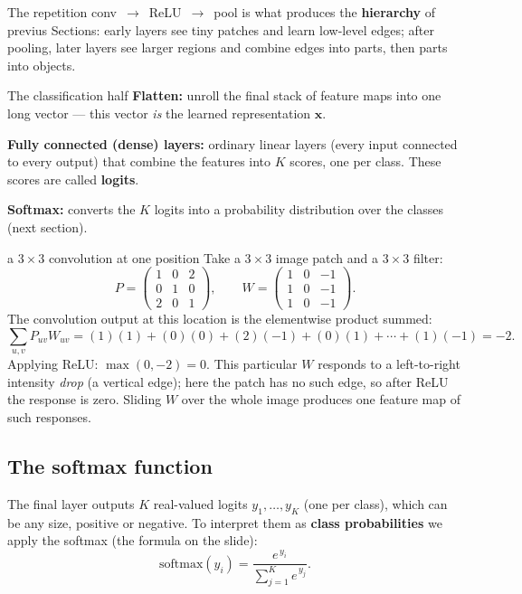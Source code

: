 \documentclass{report}
\newcommand{\xvec}{\mathbf{x}}
\begin{document}
The repetition conv~$\to$~ReLU~$\to$~pool is what produces the
\textbf{hierarchy} of previus Sections: early layers see tiny patches and learn
low-level edges; after pooling, later layers see larger regions and combine
edges into parts, then parts into objects.

\begin{defbox}{The classification half}
\textbf{Flatten:} unroll the final stack of feature maps into one long vector
--- this vector \emph{is} the learned representation $\xvec$.

\medskip
\textbf{Fully connected (dense) layers:} ordinary linear layers (every input
connected to every output) that combine the features into $K$ scores, one per
class. These scores are called \textbf{logits}.

\medskip
\textbf{Softmax:} converts the $K$ logits into a probability distribution over
the classes (next section).
\end{defbox}

\begin{exbox}{a $3\times3$ convolution at one position}
Take a $3\times3$ image patch and a $3\times3$ filter:
\[
P=\begin{pmatrix}1&0&2\\0&1&0\\2&0&1\end{pmatrix},\qquad
W=\begin{pmatrix}1&0&-1\\1&0&-1\\1&0&-1\end{pmatrix}.
\]
The convolution output at this location is the elementwise product summed:
\[
\sum_{u,v} P_{uv}W_{uv}
=(1)(1)+(0)(0)+(2)(-1)+(0)(1)+\cdots+(1)(-1)= -2 .
\]
Applying ReLU: $\max(0,-2)=0$. This particular $W$ responds to a
left-to-right intensity \emph{drop} (a vertical edge); here the patch has no
such edge, so after ReLU the response is zero. Sliding $W$ over the whole image
produces one feature map of such responses.
\end{exbox}

\subsection{The softmax function}

The final layer outputs $K$ real-valued logits $y_1,\dots,y_K$ (one per class),
which can be any size, positive or negative. To interpret them as
\textbf{class probabilities} we apply the softmax (the formula on the slide):
\[
\mathrm{softmax}(y_i) = \frac{e^{\,y_i}}{\sum_{j=1}^{K} e^{\,y_j}} .
\]
\end{document}
